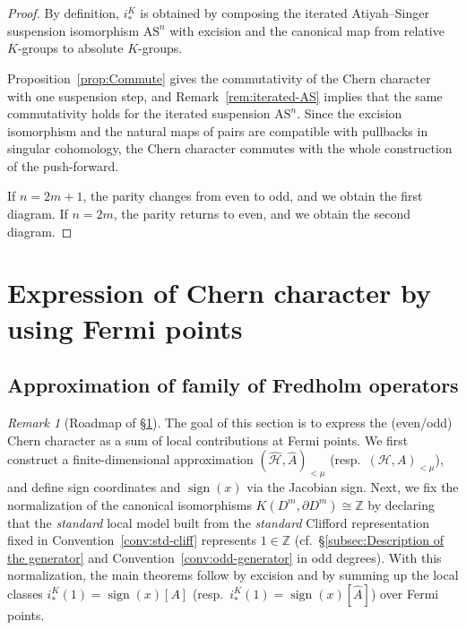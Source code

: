 \documentclass{amsart}
\theoremstyle{definition}
\theoremstyle{remark}
\newtheorem{rem}[thm]{Remark}
\begin{document}
\begin{proof}
By definition, $i_*^K$ is obtained by composing the iterated Atiyah--Singer suspension
isomorphism $\mathrm{AS}^{n}$ with excision and the canonical map from relative $K$-groups
to absolute $K$-groups.

Proposition~\ref{prop:Commute} gives the commutativity of the Chern character with one
suspension step, and Remark~\ref{rem:iterated-AS} implies that the same commutativity
holds for the iterated suspension $\mathrm{AS}^{n}$.
Since the excision isomorphism and the natural maps of pairs are compatible with pullbacks
in singular cohomology, the Chern character commutes with the whole construction of the
push-forward.

If $n=2m+1$, the parity changes from even to odd, and we obtain the first diagram.
If $n=2m$, the parity returns to even, and we obtain the second diagram.
\end{proof}



\section{Expression of Chern character by using Fermi points}
\label{sec:chern character by Fermi points}


\subsection{Approximation of family of Fredholm operators}
\label{sub:Approximation of family of Fredholm operators}

\begin{rem}[Roadmap of \S\ref{sec:chern character by Fermi points}]\label{rem:roadmap-fermi}
The goal of this section is to express the (even/odd) Chern character as a sum of local
contributions at Fermi points.
We first construct a finite-dimensional approximation $(\hat{\mathcal{H}},\hat A)_{<\mu}$ (resp.\ $(\mathcal H,A)_{<\mu}$),
and define sign coordinates and $\operatorname{sign}(x)$ via the Jacobian sign.
Next, we fix the normalization of the canonical isomorphisms
$K(D^{m},\partial D^{m})\cong \mathbb Z$ by declaring that the \emph{standard} local model
built from the \emph{standard} Clifford representation fixed in Convention~\ref{conv:std-cliff}
represents $1\in\mathbb Z$ (cf.\ \S\ref{subsec:Description of the generator} and Convention~\ref{conv:odd-generator} in odd degrees).
With this normalization, the main theorems follow by excision and by summing up the local
classes $i_*^K(1)=\operatorname{sign}(x)[A]$ (resp.\ $i_*^K(1)=\operatorname{sign}(x)[\hat A]$) over Fermi points.
\end{rem}
\end{document}
